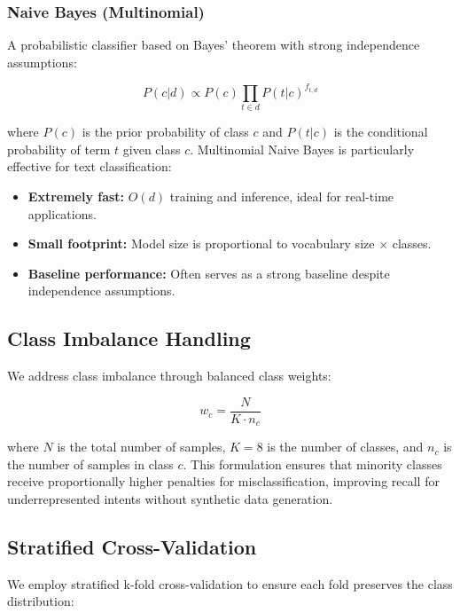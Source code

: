 \documentclass[12pt,a4paper]{article}
\begin{document}
\subsubsection{Naive Bayes (Multinomial)}
\label{subsubsec:naive-bayes}

A probabilistic classifier based on Bayes' theorem with strong independence assumptions:

\begin{equation}
    P(c|d) \propto P(c) \prod_{t \in d} P(t|c)^{f_{t,d}}
\end{equation}

where $P(c)$ is the prior probability of class $c$ and $P(t|c)$ is the conditional probability of term $t$ given class $c$. Multinomial Naive Bayes is particularly effective for text classification:
\begin{itemize}[leftmargin=*]
    \item \textbf{Extremely fast:} $O(d)$ training and inference, ideal for real-time applications.
    \item \textbf{Small footprint:} Model size is proportional to vocabulary size $\times$ classes.
    \item \textbf{Baseline performance:} Often serves as a strong baseline despite independence assumptions.
\end{itemize}

\subsection{Class Imbalance Handling}
\label{subsec:class-weights}

We address class imbalance through balanced class weights:

\begin{equation}
    w_c = \frac{N}{K \cdot n_c}
\end{equation}

where $N$ is the total number of samples, $K=8$ is the number of classes, and $n_c$ is the number of samples in class $c$. This formulation ensures that minority classes receive proportionally higher penalties for misclassification, improving recall for underrepresented intents without synthetic data generation.

\subsection{Stratified Cross-Validation}
\label{subsec:cross-validation}

We employ stratified k-fold cross-validation to ensure each fold preserves the class distribution:
\end{document}
